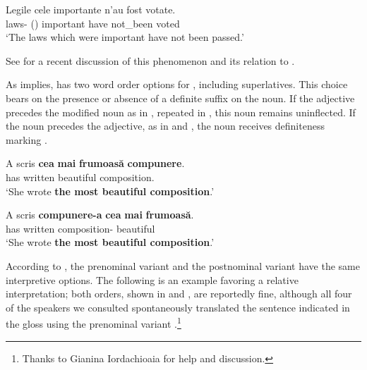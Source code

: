 \documentclass[output=paper
,modfonts
,nonflat]{langsci/langscibook}
\begin{document}
\ea \label{ex:coppockstrand:31}
\gll Legile {\op}cele{\cp} importante n'au fost votate.\\
laws- () important have not\_been voted\\
\glt `The laws which were important have not been passed.'
\z

See \citet[53--62]{Alexiadou2014} for a recent discussion of this phenomenon and its relation to  .

As  implies,
 has two word order options for , including superlatives. This choice bears on the presence or absence of a definite suffix on the noun. If the adjective precedes the modified noun as in , repeated in , this noun remains uninflected. If the noun precedes the adjective, as in  and , the noun receives definiteness marking \citep[53]{Cojocaru2003}.

\ea \label{ex:coppockstrand:32}
\begin{xlist}
\ex \label{ex:coppockstrand:32a}
\gll A scris \textbf{cea} \textbf{mai} \textbf{frumoasă} \textbf{compunere}.\\
has written  \cmpr{} beautiful composition.\acc\\
\glt `She wrote \textbf{the most beautiful composition}.'

\ex \label{ex:coppockstrand:32b}
\gll A scris \textbf{compunere-a} \textbf{cea} \textbf{mai} \textbf{frumoasă}.\\
has written composition-  \cmpr{} beautiful\\
\glt `She wrote \textbf{the most beautiful composition}.'
\end{xlist}
\z

According to \citet{Teodorescu2007}, the prenominal variant  and the postnominal variant  have the same interpretive options. The following is an example favoring a relative interpretation; both orders, shown in  and , are reportedly fine, although all four of the  speakers we consulted spontaneously translated the sentence indicated in the  gloss using the prenominal variant .\footnote{Thanks to Gianina Iordachioaia for help and discussion.}
\end{document}
